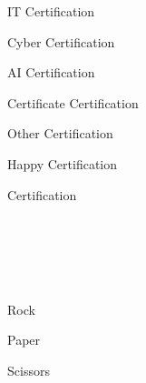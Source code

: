 \documentclass[11pt]{spidercv}
\begin{document}
\begin{SecondaryPage}{\ColorBackground}
    \vspace*{0.5cm}
    \begin{TripleColumns}
        \begin{ItemList}{\ColorHighlight}
            \item [] IT Certification
            \item [] Cyber Certification
            \item [] AI Certification
            \item [] Certificate Certification
            \item [] Other Certification
            \item [] Happy Certification
            \item [] Certification
        \end{ItemList}
        \nextcolumn
        \begin{center}
            \\
            \\
            \\
            \\
        \end{center}
        \lorem\lorem\lorem\lorem\lorem\lorem
        \nextcolumn
        \begin{ItemList}{\ColorHighlight}
            \item [\faStar] \lorem
            \item [\faStar] \lorem
            \item [\faStar] Rock
            \item [\faStar] Paper
            \item [\faStar] Scissors
            \item [\faStar] \lorem
            \item [\faStar] \lorem
        \end{ItemList}
    \end{TripleColumns}


\end{SecondaryPage}
\end{document}
